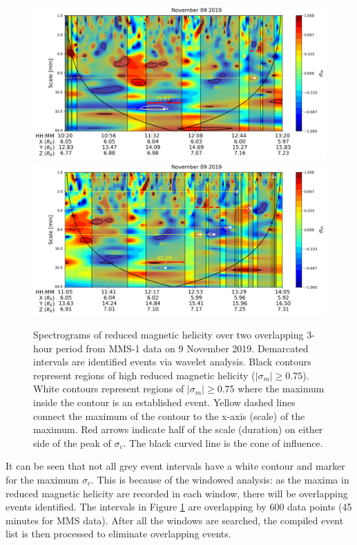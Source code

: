 \begin{figure}
    \centering
    \includegraphics[width=\textwidth]{Figures/Spectrograms/magnetichelicity_wave_events_09112019_1020.png}
    \includegraphics[width=\textwidth]{Figures/Spectrograms/magnetichelicity_wave_events_09112019_1105.png}
    \caption[Diagram of wavelet analysis identification algorithm via spectrograms of MHD quantities]{Spectrograms of reduced magnetic helicity over two overlapping 3-hour period from MMS-1 data on 9 November 2019. Demarcated intervals are identified events via wavelet analysis. Black contours represent regions of high reduced magnetic helicity ($|\sigma_m| \geq 0.75$). White contours represent regions of $|\sigma_m| \geq 0.75$ where the maximum inside the contour is an established event. Yellow dashed lines connect the maximum of the contour to the x-axis (scale) of the maximum. Red arrows indicate half of the scale (duration) on either side of the peak of $\sigma_c$. The black curved line is the cone of influence.}
    \label{fig:spectrograms-interval}
\end{figure}

It can be seen that not all grey event intervals have a white contour and marker for the maximum $\sigma_c$. This is because of the windowed analysis: as the maxima in reduced magnetic helicity are recorded in each window, there will be overlapping events identified. The intervals in Figure \ref{fig:spectrograms-interval} are overlapping by 600 data points (45 minutes for MMS data). After all the windows are searched, the compiled event list is then processed to eliminate overlapping events. %



